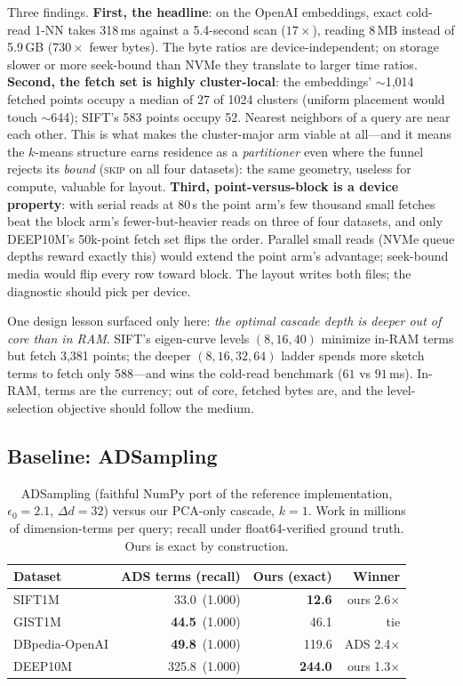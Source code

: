 \documentclass[sigconf,nonacm]{acmart}
\begin{document}
Three findings. \textbf{First, the headline}: on the OpenAI embeddings,
exact cold-read 1-NN takes 318\,ms against a 5.4-second scan
($17\times$), reading 8\,MB instead of 5.9\,GB ($730\times$ fewer bytes).
The byte ratios are device-independent; on storage slower or more
seek-bound than NVMe they translate to larger time ratios.
\textbf{Second, the fetch set is highly cluster-local}: the embeddings'
$\sim$1{,}014 fetched points occupy a median of 27 of 1024 clusters
(uniform placement would touch $\sim$644); SIFT's 583 points occupy 52.
Nearest neighbors of a query are near each other. This is what makes the
cluster-major arm viable at all---and it means the $k$-means structure
earns residence as a \emph{partitioner} even where the funnel rejects its
\emph{bound} (\textsc{skip} on all four datasets): the same geometry,
useless for compute, valuable for layout. \textbf{Third, point-versus-block
is a device property}: with serial reads at 80\,\textmu s the point arm's
few thousand small fetches beat the block arm's fewer-but-heavier reads on
three of four datasets, and only DEEP10M's 50k-point fetch set flips the
order. Parallel small reads (NVMe queue depths reward exactly this) would
extend the point arm's advantage; seek-bound media would flip every row
toward block. The layout writes both files; the diagnostic should pick per
device.

One design lesson surfaced only here: \emph{the optimal cascade depth is
deeper out of core than in RAM}. SIFT's eigen-curve levels $(8,16,40)$
minimize in-RAM terms but fetch 3{,}381 points; the deeper $(8,16,32,64)$
ladder spends more sketch terms to fetch only 588---and wins the cold-read
benchmark ($61$ vs $91$\,ms). In-RAM, terms are the currency; out of core,
fetched bytes are, and the level-selection objective should follow the
medium.

\subsection{Baseline: ADSampling}
\label{sec:ads}

\begin{table}[t]
\caption{ADSampling (faithful NumPy port of the reference implementation,
$\epsilon_0{=}2.1$, $\Delta d{=}32$) versus our PCA-only cascade, $k=1$.
Work in millions of dimension-terms per query; recall under
float64-verified ground truth. Ours is exact by construction.}
\label{tab:ads}
\small
\begin{tabular}{@{}lrrr@{}}
\toprule
Dataset & ADS terms (recall) & Ours (exact) & Winner \\
\midrule
SIFT1M & 33.0 \,(1.000) & \textbf{12.6} & ours 2.6$\times$ \\
GIST1M & \textbf{44.5} \,(1.000) & 46.1 & tie \\
DBpedia-OpenAI & \textbf{49.8} \,(1.000) & 119.6 & ADS 2.4$\times$ \\
DEEP10M & 325.8 \,(1.000) & \textbf{244.0} & ours 1.3$\times$ \\
\bottomrule
\end{tabular}
\end{table}
\end{document}
